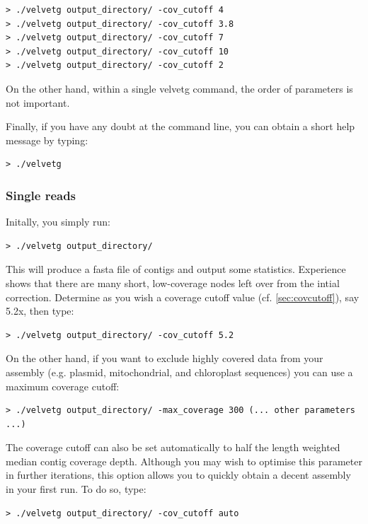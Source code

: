 \documentclass{article}
\begin{document}
\begin{verbatim}
> ./velvetg output_directory/ -cov_cutoff 4
> ./velvetg output_directory/ -cov_cutoff 3.8
> ./velvetg output_directory/ -cov_cutoff 7
> ./velvetg output_directory/ -cov_cutoff 10
> ./velvetg output_directory/ -cov_cutoff 2
\end{verbatim}

On the other hand, within a single velvetg command, the order of parameters is not important.

Finally, if you have any doubt at the command line, you can obtain a short help message by typing:

\begin{verbatim}
> ./velvetg
\end{verbatim}

	\subsubsection{Single reads}
	
	\label{sec:velvetg}

Initally, you simply run: 
\begin{verbatim}
> ./velvetg output_directory/
\end{verbatim}

This will produce a fasta file of contigs and output some statistics.
Experience shows that there are many short, low-coverage nodes left over from the intial correction. Determine as you wish a coverage cutoff value (cf. \ref{sec:covcutoff}), say 5.2x, then type:

\begin{verbatim}
> ./velvetg output_directory/ -cov_cutoff 5.2
\end{verbatim}

On the other hand, if you want to exclude highly covered data from your assembly (e.g. plasmid, mitochondrial, and chloroplast sequences) you can use a maximum coverage cutoff:

\begin{verbatim}
> ./velvetg output_directory/ -max_coverage 300 (... other parameters ...)
\end{verbatim}

The coverage cutoff can also be set automatically to half the length weighted median contig coverage depth. Although you may wish to optimise this parameter in further iterations, this option allows you to quickly obtain a decent assembly in your first run. To do so, type:

\begin{verbatim}
> ./velvetg output_directory/ -cov_cutoff auto
\end{verbatim}
\end{document}
